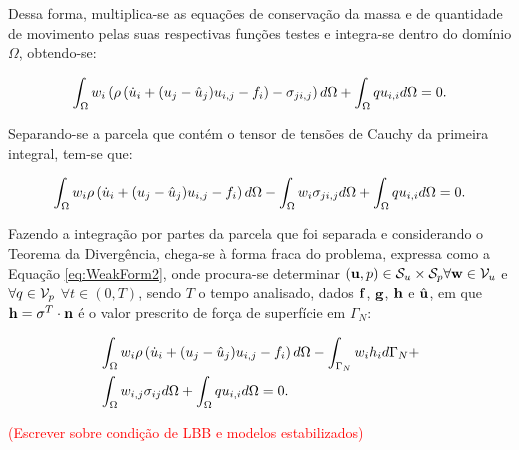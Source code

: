 \documentclass[_ArquivoPrincipal.tex]{subfiles}
\begin{document}
Dessa forma, multiplica-se as equações de conservação da massa e de quantidade de movimento pelas suas respectivas funções testes e integra-se dentro do domínio $\Omega$, obtendo-se:

\begin{equation}
    \int_{\Omega}{w_i\left({\rho\left({\dot{u}_i+(u_j-\hat{u}_j)u_{i,j}-f_i}\right)-\sigma_{ji,j}}\right) d\Omega}+\int_{\Omega}{qu_{i,i} d\Omega}=0\text{.}
\end{equation}

Separando-se a parcela que contém o tensor de tensões de Cauchy da primeira integral, tem-se que:

\begin{equation}
    \int_{\Omega}{w_i\rho\left({\dot{u}_i+(u_j-\hat{u}_j)u_{i,j}-f_i}\right) d\Omega}-\int_{\Omega}{w_i\sigma_{ji,j} d\Omega}+\int_{\Omega}{qu_{i,i} d\Omega}=0\text{.}
    \label{eq:WeakForm1}
\end{equation}

Fazendo a integração por partes da parcela que foi separada e considerando o Teorema da Divergência, chega-se à forma fraca do problema, expressa como a Equação \ref{eq:WeakForm2}, onde procura-se determinar $(\mathbf{u},p)\in\mathcal{S}_u\times\mathcal{S}_p\forall\mathbf{w}\in\mathcal{V}_u$ e $\forall q\in\mathcal{V}_p$ $\forall t\in(0,T)$, sendo $T$ o tempo analisado, dados $\mathbf{f}$, $\mathbf{g}$, $\mathbf{h}$ e $\hat{\mathbf{u}}$, em que $\mathbf{h}=\mathbf{\sigma}^T\cdot\mathbf{n}$ é o valor prescrito de força de superfície em $\Gamma_N$:

\begin{equation}
    \begin{split}
        &\int_{\Omega}{w_i\rho\left({\dot{u}_i+(u_j-\hat{u}_j)u_{i,j}-f_i}\right) d\Omega}-\int_{\Gamma_N}{w_ih_i d\Gamma_N}+\\
        &\int_{\Omega}{w_{i,j}\sigma_{ij} d\Omega}+\int_{\Omega}{qu_{i,i} d\Omega}=0\text{.}
    \end{split}
    \label{eq:WeakForm2}
\end{equation}

\textcolor{red}{(Escrever sobre condição de LBB e modelos estabilizados)}
\end{document}
